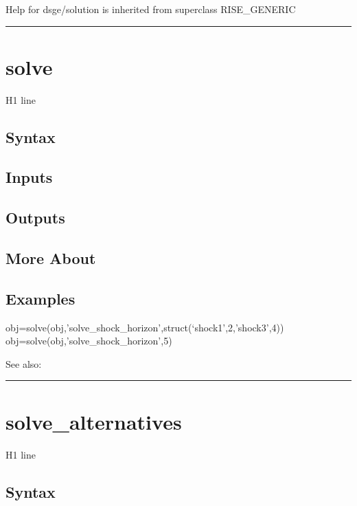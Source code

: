 \documentclass[letterpaper,10pt,english]{sphinxmanual}
\begin{document}
Help for dsge/solution is inherited from superclass RISE\_GENERIC


\bigskip\hrule{}\bigskip



\section{solve}
\label{classes/models/@dsge/dsge:id209}\label{classes/models/@dsge/dsge:solve}
H1 line


\subsection{Syntax}
\label{classes/models/@dsge/dsge:id210}

\subsection{Inputs}
\label{classes/models/@dsge/dsge:id211}

\subsection{Outputs}
\label{classes/models/@dsge/dsge:id212}

\subsection{More About}
\label{classes/models/@dsge/dsge:id213}

\subsection{Examples}
\label{classes/models/@dsge/dsge:id214}
obj=solve(obj,'solve\_shock\_horizon',struct(`shock1',2,'shock3',4))
obj=solve(obj,'solve\_shock\_horizon',5)

See also:


\bigskip\hrule{}\bigskip



\section{solve\_alternatives}
\label{classes/models/@dsge/dsge:id215}\label{classes/models/@dsge/dsge:solve-alternatives}
H1 line


\subsection{Syntax}
\label{classes/models/@dsge/dsge:id216}
\end{document}
